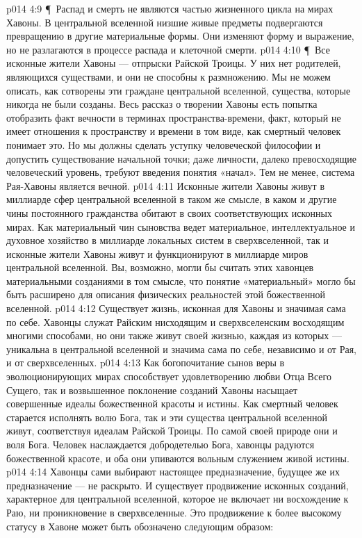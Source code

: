 \vs p014 4:9 \P\ Распад и смерть не являются частью жизненного цикла на мирах Хавоны. В центральной вселенной низшие живые предметы подвергаются превращению в другие материальные формы. Они изменяют форму и выражение, но не разлагаются в процессе распада и клеточной смерти.
\vs p014 4:10 \P\ Все исконные жители Хавоны --- отпрыски Райской Троицы. У них нет родителей, являющихся существами, и они не способны к размножению. Мы не можем описать, как сотворены эти граждане центральной вселенной, существа, которые никогда не были созданы. Весь рассказ о творении Хавоны есть попытка отобразить факт вечности в терминах пространства\hyp{}времени, факт, который не имеет отношения к пространству и времени в том виде, как смертный человек понимает это. Но мы должны сделать уступку человеческой философии и допустить существование начальной точки; даже личности, далеко превосходящие человеческий уровень, требуют введения понятия «начал». Тем не менее, система Рая\hyp{}Хавоны является вечной.
\vs p014 4:11 Исконные жители Хавоны живут в миллиарде сфер центральной вселенной в таком же смысле, в каком и другие чины постоянного гражданства обитают в своих соответствующих исконных мирах. Как материальный чин сыновства ведет материальное, интеллектуальное и духовное хозяйство в миллиарде локальных систем в сверхвселенной, так и исконные жители Хавоны живут и функционируют в миллиарде миров центральной вселенной. Вы, возможно, могли бы считать этих хавонцев материальными созданиями в том смысле, что понятие «материальный» могло бы быть расширено для описания физических реальностей этой божественной вселенной.
\vs p014 4:12 Существует жизнь, исконная для Хавоны и значимая сама по себе. Хавонцы служат Райским нисходящим и сверхвселенским восходящим многими способами, но они также живут своей жизнью, каждая из которых --- уникальна в центральной вселенной и значима сама по себе, независимо и от Рая, и от сверхвселенных.
\vs p014 4:13 Как богопочитание сынов веры в эволюционирующих мирах способствует удовлетворению любви Отца Всего Сущего, так и возвышенное поклонение созданий Хавоны насыщает совершенные идеалы божественной красоты и истины. Как смертный человек старается исполнять волю Бога, так и эти существа центральной вселенной живут, соответствуя идеалам Райской Троицы. По самой своей природе они и  воля Бога. Человек наслаждается добродетелью Бога, хавонцы радуются божественной красоте, и оба они упиваются вольным служением живой истины.
\vs p014 4:14 Хавонцы сами выбирают настоящее предназначение, будущее же их предназначение --- не раскрыто. И существует продвижение исконных созданий, характерное для центральной вселенной, которое не включает ни восхождение к Раю, ни проникновение в сверхвселенные. Это продвижение к более высокому статусу в Хавоне может быть обозначено следующим образом:
